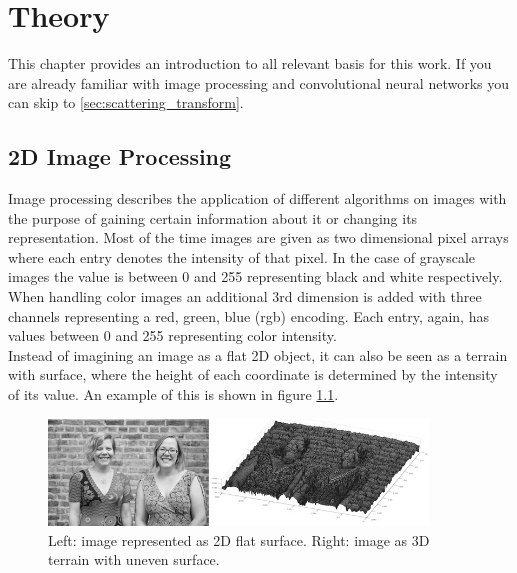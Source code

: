 \chapter{Theory}
\label{chap:theory}

This chapter provides an introduction to all relevant basis for this work. If you are already familiar with image processing and convolutional neural networks you can skip to \ref{sec:scattering_transform}.

\section{2D Image Processing}

Image processing describes the application of different algorithms on images with the purpose of gaining certain information about it or changing its representation. Most of the time images are given as two dimensional pixel arrays where each entry denotes the intensity of that pixel. In the case of grayscale images the value is between 0 and 255 representing black and white respectively. When handling color images an additional 3rd dimension is added with three channels representing a red, green, blue (rgb) encoding. Each entry, again, has values between 0 and 255 representing color intensity. \\
Instead of imagining an image as a flat 2D object, it can also be seen as a terrain with surface, where the height of each coordinate is determined by the intensity of its value. An example of this is shown in figure \ref{fig:image_surfaces}. 


\begin{figure}[!htb]
	\centering
	\includegraphics[width = 0.9\textwidth]{images/image_surfaces.jpg}
	\caption{Left: image represented as 2D flat surface. Right: image as 3D terrain with uneven surface. \protect\footnotemark}
	\label{fig:image_surfaces}
\end{figure}



